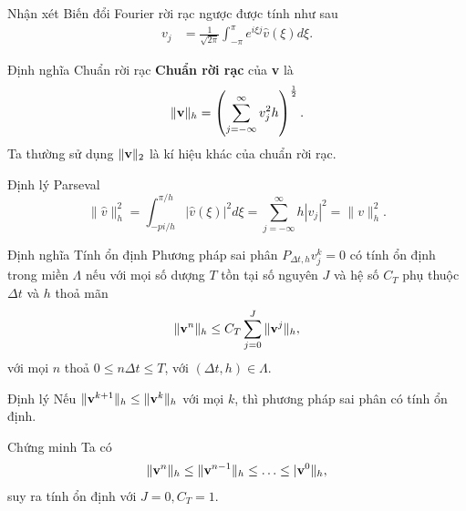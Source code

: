 \documentclass[9pt]{beamer}
\numberwithin{equation}{section}
\begin{document}
\begin{frame}
\begin{exampleblock}{Nhận xét}
    Biến đổi Fourier rời rạc ngược được tính như sau
    \begin{align*}
        v_j &= \frac{1}{\sqrt{2\pi}} \int_{-\pi}^\pi e^{i\xi j} \hat{v}(\xi) d\xi.
    \end{align*}
\end{exampleblock}

\begin{block}{Định nghĩa Chuẩn rời rạc}
   \textbf{Chuẩn rời rạc} của {\bf v} là
   \begin{align*}
       \|{\bf v}\|_h = \left(\sum_{j=-\infty}^\infty v_j^2 h\right)^\frac{1}{2}.
   \end{align*}
   Ta thường sử dụng $\|{\bf v}\|_2$ là kí hiệu khác của chuẩn rời rạc.
\end{block}

\begin{block}{Định lý Parseval}
    $$\|\hat{v}\|_h^2 = \int_{-pi/h}^{\pi/h} |\hat{v}(\xi)|^2 d\xi = \sum_{j=-\infty}^\infty h|v_j|^2 = \|v\|_h^2.$$
\end{block}
\end{frame}

\begin{frame}
\begin{block}{Định nghĩa Tính ổn định}
    Phương pháp sai phân $P_{\Delta t, h} v_j^k = 0$ có tính ổn định trong miền $\Lambda$ nếu với mọi số dượng $T$ tồn tại số nguyên $J$ và hệ số $C_T$ phụ thuộc $\Delta t$ và $h$ thoả mãn
    \begin{align*}
        \|{\bf v}^n\|_h \le C_T \sum_{j=0}^J \|{\bf v}^j\|_h,
    \end{align*}
    với mọi $n$ thoả $0 \le n \Delta t \le T$, với $(\Delta t, h) \in \Lambda$.
\end{block}

\begin{block}{Định lý}
    Nếu $\|{\bf v}^{k+1}\|_h \le \|{\bf v}^k\|_h$ với mọi $k$, thì phương pháp sai phân có tính ổn định.
\end{block}

\begin{exampleblock}{Chứng minh}
    Ta có
    \begin{align*}
        \|{\bf v}^n\|_h \le \|{\bf v}^{n-1}\|_h \le \ldots \le |{\bf v}^0\|_h,
    \end{align*}
    suy ra tính ổn định với $J=0, C_T = 1$.
\end{exampleblock}
\end{frame}
\end{document}
